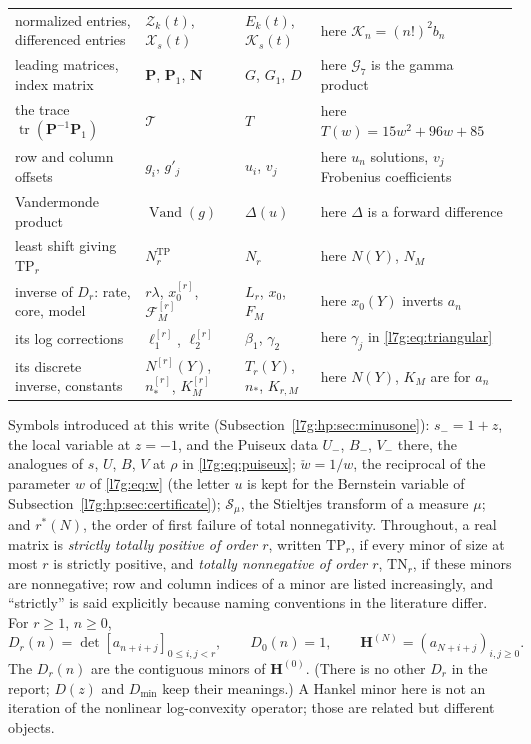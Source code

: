 \documentclass[11pt,letterpaper]{article}
\theoremstyle{remark}\newtheorem{remark}[theorem]{Remark}
\newcommand{\G}{\mathcal G_7}\newcommand{\Ast}{A_\star}
\newcommand{\TP}{\mathrm{TP}}\newcommand{\TN}{\mathrm{TN}}
\newcounter{l7gtrsavedeq}
\begin{document}
\begin{center}
\begin{longtable}{p{}p{}p{}p{}}
normalized entries, differenced entries & $\mathcal Z_k(t)$, $\mathcal X_s(t)$ & $E_k(t)$, $\mathcal K_s(t)$ & here $\mathcal K_n=(n!)^2b_n$\\
leading matrices, index matrix & $\mathbf P$, $\mathbf P_1$, $\mathbf N$ & $G$, $G_1$, $D$ & here $\G$ is the gamma product\\
the trace $\operatorname{tr}(\mathbf P^{-1}\mathbf P_1)$ & $\mathcal T$ & $T$ & here $T(w)=15w^2+96w+85$\\
row and column offsets & $g_i$, $g'_j$ & $u_i$, $v_j$ & here $u_n$ solutions, $v_j$ Frobenius coefficients\\
Vandermonde product & $\operatorname{Vand}(g)$ & $\Delta(u)$ & here $\Delta$ is a forward difference\\
least shift giving $\TP_r$ & $N^{\TP}_r$ & $N_r$ & here $N(Y)$, $N_M$\\
inverse of $D_r$: rate, core, model & $r\lambda$, $x^{[r]}_0$, $\mathcal F^{[r]}_M$ & $L_r$, $x_0$, $F_M$ & here $x_0(Y)$ inverts $a_n$\\
its log corrections & $\ell^{[r]}_1$, $\ell^{[r]}_2$ & $\beta_1$, $\gamma_2$ & here $\gamma_j$ in \eqref{l7g:eq:triangular}\\
its discrete inverse, constants & $N^{[r]}(Y)$, $n^{[r]}_*$, $K^{[r]}_M$ & $T_r(Y)$, $n_*$, $K_{r,M}$ & here $N(Y)$, $K_M$ are for $a_n$\\
\bottomrule
\end{longtable}
\end{center}
Symbols introduced at this write (Subsection~\ref{l7g:hp:sec:minusone}):
$s_-=1+z$, the local variable at $z=-1$, and the Puiseux data
$U_-$, $B_-$, $V_-$ there, the analogues of $s$, $U$, $B$, $V$ at $\rho$
in \eqref{l7g:eq:puiseux}; $\check w=1/w$, the reciprocal of the parameter
$w$ of \eqref{l7g:eq:w} (the letter $u$ is kept for the Bernstein variable
of Subsection~\ref{l7g:hp:sec:certificate}); $\mathcal S_\mu$, the
Stieltjes transform of a measure $\mu$; and $r^*(N)$, the order of first
failure of total nonnegativity. Throughout, a real matrix is \emph{strictly
totally positive of order $r$}, written $\TP_r$, if every minor of size at
most $r$ is strictly positive, and \emph{totally nonnegative of order
$r$}, $\TN_r$, if these minors are nonnegative; row and column indices of
a minor are listed increasingly, and ``strictly'' is said explicitly
because naming conventions in the literature differ. For $r\ge1$, $n\ge0$,
\begin{equation}\label{l7g:hp:eq:Ddef}
 D_r(n)=\det[a_{n+i+j}]_{0\le i,j<r},\qquad D_0(n)=1,\qquad
 \mathbf H^{(N)}=(a_{N+i+j})_{i,j\ge0}.
\end{equation}
The $D_r(n)$ are the contiguous minors of $\mathbf H^{(0)}$. (There is no
other $D_r$ in the report; $D(z)$ and $D_{\min}$ keep their meanings.)
A Hankel minor here is not an iteration of the nonlinear log-convexity
operator; those are related but different objects.
\end{document}
